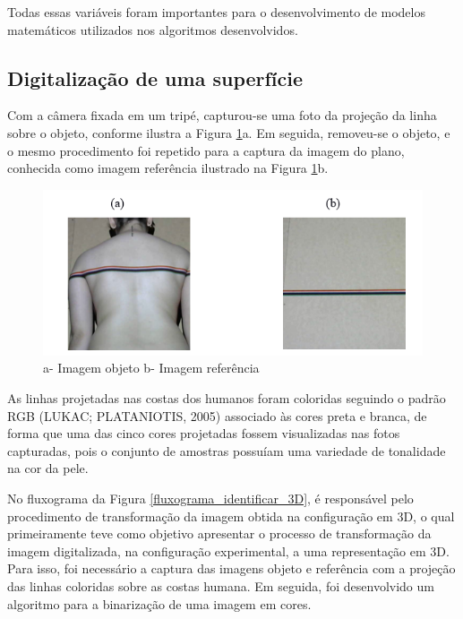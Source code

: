 \documentclass[a4paper, 12pt]{article}
\begin{document}
Todas essas variáveis foram importantes para o desenvolvimento de modelos matemáticos utilizados nos algoritmos desenvolvidos. 

\subsection{Digitalização de uma superfície}

Com a câmera fixada em um tripé, capturou-se uma foto da projeção da linha sobre o objeto, conforme ilustra a Figura \ref{imagem_projecao_colorida}a. Em seguida, removeu-se o objeto, e o mesmo procedimento foi repetido para a captura da imagem do plano, conhecida como imagem referência ilustrado na Figura \ref{imagem_projecao_colorida}b. 

\begin{figure}[H]
	\centering
		\includegraphics[scale=0.5]{imagem_projecao_colorida.png}
	\caption{a- Imagem objeto b- Imagem referência}
	\label{imagem_projecao_colorida}
\end{figure}

As linhas projetadas nas costas dos humanos foram coloridas seguindo o padrão RGB (LUKAC; PLATANIOTIS, 2005) associado às cores preta e branca, de forma que uma das cinco cores projetadas fossem visualizadas nas fotos capturadas, pois o conjunto de amostras possuíam uma variedade de tonalidade na cor da pele.

No fluxograma da Figura \ref{fluxograma_identificar_3D}, é responsável pelo procedimento de transformação da imagem obtida na configuração em 3D, o qual primeiramente teve como objetivo apresentar o processo de transformação da imagem digitalizada, na configuração experimental, a uma representação em 3D. Para isso, foi necessário a captura das imagens objeto e referência com a projeção das linhas coloridas sobre as costas humana. Em seguida, foi desenvolvido um algoritmo para a binarização de uma imagem em cores.
\end{document}
